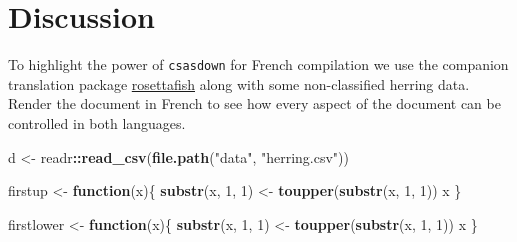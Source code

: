 \documentclass[12pt]{article}\usepackage[]{graphicx}\usepackage[]{color}
\newenvironment{Shaded}{}{}
\newcommand{\KeywordTok}[1]{\textcolor[rgb]{0.00,0.44,0.13}{\textbf{{#1}}}}
\newcommand{\DecValTok}[1]{\textcolor[rgb]{0.25,0.63,0.44}{{#1}}}
\newcommand{\StringTok}[1]{\textcolor[rgb]{0.25,0.44,0.63}{{#1}}}
\newcommand{\NormalTok}[1]{{#1}}
\newcommand{\OperatorTok}[1]{\textcolor[rgb]{0.00,0.44,0.13}{\textbf{{#1}}}}
\newcommand{\ControlFlowTok}[1]{\textcolor[rgb]{0.00,0.44,0.13}{\textbf{{#1}}}}
\begin{document}
\section{Discussion}\label{discussion}

To highlight the power of \texttt{csasdown} for French compilation we use the companion translation package \href{https://github.com/pbs-assess/rosettafish}{rosettafish} along with some non-classified herring data. Render the document in French to see how every aspect of the document can be controlled in both languages.
\begin{Shaded}
\begin{Highlighting}[]
\NormalTok{d <-}\StringTok{ }\NormalTok{readr}\OperatorTok{::}\KeywordTok{read_csv}\NormalTok{(}\KeywordTok{file.path}\NormalTok{(}\StringTok{"data"}\NormalTok{, }\StringTok{"herring.csv"}\NormalTok{))}

\NormalTok{firstup <-}\StringTok{ }\ControlFlowTok{function}\NormalTok{(x)\{}
  \KeywordTok{substr}\NormalTok{(x, }\DecValTok{1}\NormalTok{, }\DecValTok{1}\NormalTok{) <-}\StringTok{ }\KeywordTok{toupper}\NormalTok{(}\KeywordTok{substr}\NormalTok{(x, }\DecValTok{1}\NormalTok{, }\DecValTok{1}\NormalTok{))}
\NormalTok{  x}
\NormalTok{\}}

\NormalTok{firstlower <-}\StringTok{ }\ControlFlowTok{function}\NormalTok{(x)\{}
  \KeywordTok{substr}\NormalTok{(x, }\DecValTok{1}\NormalTok{, }\DecValTok{1}\NormalTok{) <-}\StringTok{ }\KeywordTok{toupper}\NormalTok{(}\KeywordTok{substr}\NormalTok{(x, }\DecValTok{1}\NormalTok{, }\DecValTok{1}\NormalTok{))}
\NormalTok{  x}
\NormalTok{\}}


\end{Highlighting}
\end{Shaded}
\end{document}
